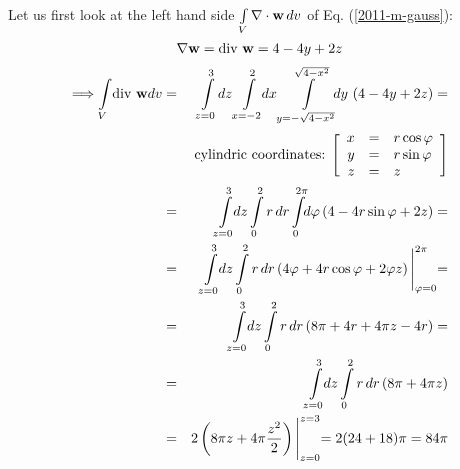 {\begin{enumerate}
Let us first look at the left hand side $\int \limits_V \nabla \cdot {\bf w} \, dv $
of Eq. (\ref{2011-m-gauss}):
$$
  \nabla {\bf w}=\textrm{div } {\bf w}=4-4y+2z
$$
\begin{eqnarray*}
  \Longrightarrow \int \limits_V \! \textrm{div } {\bf w} dv& = &
  \int \limits_{z=0}^3 \! dz \int \limits_{x=-2}^2 \!\! dx
  \int \limits_{y=-\sqrt{4-x^2}}^{\sqrt{4-x^2}} \!\!\!dy\,
    \left(4-4y+2z\right)= \\
  & & \mbox{cylindric coordinates: }
  \Biggl[
    \begin{array}{rcl}
      x & = & r \cos \varphi \\
      y & = & r \sin \varphi \\
      z & = & z
    \end{array}
  \Biggr] \\
  & = & \int \limits_{z=0}^3 \!\! dz \int \limits_0^2 r\, dr
  \int \limits_0^{2\pi} \!\! d\varphi \left(4-4r \sin \varphi+2z\right)= \\
  & = & \int \limits_{z=0}^3 \!\! dz \int \limits_0^2 r \, dr
  \left(4 \varphi +4r\cos\varphi+2\varphi z\right)
  \Biggl|_{\varphi=0}^{2 \pi}= \\
  & = & \int \limits_{z=0}^3 \!\! dz \int \limits_0^2 r\, dr
  \left(8 \pi +4r+4 \pi z -4r\right)= \\
  & = & \int \limits_{z=0}^3 \!\! dz \int \limits_0^2 r\, dr
  \left(8 \pi +4 \pi z\right) \\
  & = & 2 \left( 8 \pi z +4 \pi \frac{z^2}{2}\right)\Biggl|_{z=0}^{z=3}=
    2 (24+18) \pi = 84 \pi
\end{eqnarray*}


\end{enumerate}}
